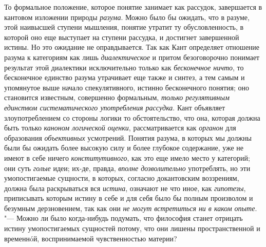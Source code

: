 {То формальное положение, которое понятие занимает как
рассудок, завершается в кантовом изложении природы
{\em разума}. Можно было
бы ожидать, что в разуме, этой наивысшей ступени мышления, понятие утратит
ту обусловленность, в которой оно еще выступает на ступени рассудка, и
достигнет завершенной истины. Но это ожидание не оправдывается. Так как
Кант определяет отношение разума к категориям как лишь
{\em диалектическое} и
притом безоговорочно понимает результат этой диалектики исключительно
только как {\em бесконечное ничто},
то бесконечное единство разума утрачивает еще
также и синтез, а тем самым и упомянутое выше начало
спекулятивного, истинно бесконечного понятия; оно становится известным,
совершенно формальным, {\em только
регулятивным единством систематического употребления рассудка}.
Кант объявляет злоупотреблением со стороны логики то
обстоятельство, что она, которая должна быть только
{\em каноном логической оценки},
рассматривается как
{\em органон} для
образования {\em объективных}
усмотрений. Понятия разума, в которых мы должны были бы
ожидать более высокую силу и более глубокое содержание, уже не имеют в себе
ничего {\em конститутивного},
как это еще имело место у категорий; они суть
{\em голые} идеи; их-де,
правда, {\em вполне дозволительно}
употреблять, но эти умопостигаемые сущности, в которых,
согласно докантовским воззрениям, должна была раскрываться вся
{\em истина}, означают не
что иное, как {\em гипотезы},
приписывать которым истину в себе и для себя было бы полным
произволом и безумным дерзновением, так как они
{\em не могут встретиться ни в каком
опыте}. "--- Можно ли было когда-нибудь подумать, что философия
станет отрицать истину умопостигаемых сущностей потому, что они лишены
пространственной и временнóй, воспринимаемой чувственностью материи?

}
